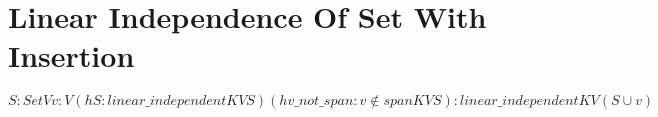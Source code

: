 \section{Linear Independence Of Set With Insertion}

\begin{theorem}
  \label{theorem : linear_independent_insert_of_not_in_span}
  \leanok
  ${S : Set V} {v : V}
  (hS : linear\_independent K V S)
  (hv\_not\_span : v \notin span K V S):
  linear\_independent K V (S \cup {v})$
\end{theorem}
